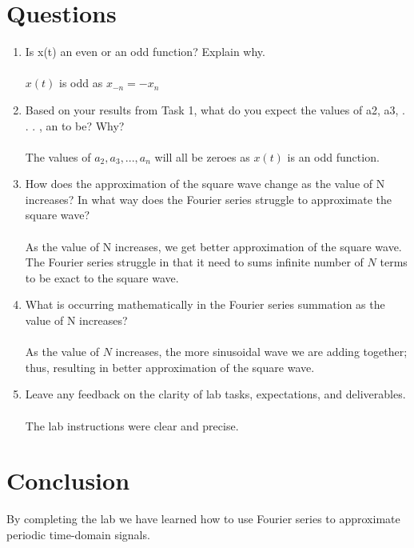 \documentclass[12pt,a4paper]{article}
\begin{document}
\section{Questions}\label{sec:res}
\begin{enumerate}
    \item Is x(t) an even or an odd function? Explain why.\\
    \\$x(t)$ is odd as $x_{-n} = -x_{n}$\\
    
    \item Based on your results from Task 1, what do you expect the values of a2, a3, . . . , an to be? Why?\\
    \\The values of $a_{2}, a_{3},..., a_{n}$ will all be zeroes as $x(t)$ is an odd function.\\ 
    
    \item How does the approximation of the square wave change as the value of N increases? In what way does the Fourier series struggle to approximate the square wave?\\
    \\As the value of N increases, we get better approximation of the square wave.
    \\The Fourier series struggle in that it need to sums infinite number of $N$ terms to be exact to the square wave.\\  
    
    \item What is occurring mathematically in the Fourier series summation as the value of N increases?\\
    \\As the value of $N$ increases, the more sinusoidal wave we are adding together; thus, resulting in better approximation of the square wave.\\
    
    \item Leave any feedback on the clarity of lab tasks, expectations, and deliverables.\\
    \\The lab instructions were clear and precise.
\end{enumerate}

\section{Conclusion}\label{sec:res}
    
    By completing the lab we have learned how to use Fourier series to approximate periodic time-domain signals.
 


\end{document}
